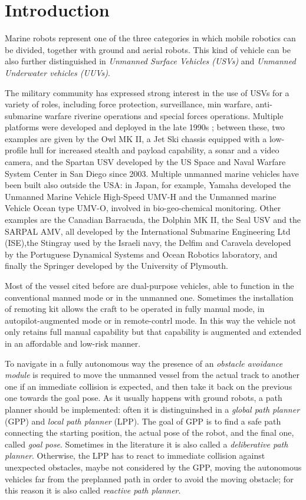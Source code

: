 \documentclass[journal]{IEEEtran}
\begin{document}
\section{Introduction} \label{introduction}

      Marine robots represent one of the three categories in which mobile robotics can be divided, together with ground and aerial robots. This kind of vehicle can be also further distinguished in \textit{Unmanned Surface Vehicles (USVs)} and \textit{Unmanned Underwater vehicles (UUVs)}.

      \indent The military community has expressed strong interest in the use of USVs for a variety of roles, including force protection, surveillance, min warfare, anti-submarine warfare riverine operations and special forces operations. Multiple platforms were developed and deployed in the late 1990s  \parencite{Bertram2008}; between these, two examples are given by the Owl MK II, a Jet Ski chassis equipped with a low-profile hull for increased stealth and payload capability, a sonar and a video camera, and the Spartan USV developed by the US Space and Naval Warfare System Center in San Diego since 2003. Multiple unmanned marine vehicles have been built also outside the USA: in Japan, for example, Yamaha developed the Unmanned Marine Vehicle High-Speed UMV-H and the Unmanned marine Vehicle Ocean type UMV-O, involved in bio-geo-chemical monitoring. Other examples are the Canadian Barracuda, the Dolphin MK II, the Seal USV and the SARPAL AMV, all developed by the International Submarine Engineering Ltd (ISE),the Stingray used by the Israeli navy, the Delfim and Caravela developed by the Portuguese Dynamical Systems and Ocean Robotics laboratory, and finally the Springer developed by the University of Plymouth.

      \indent Most of the vessel cited before are dual-purpose vehicles, able to function in the conventional manned mode or in the unmanned one. Sometimes the installation of remoting kit allows the craft to be operated in fully manual mode, in autopilot-augmented mode or in remote-contrl mode. In this way the vehicle not only retains full manual capability but that capability is augmented and extended in an affordable and low-risk manner.

      \indent To navigate in a fully autonomous way the presence of an \textit{obstacle avoidance module} is required to move the unmanned vessel from the actual track to another one if an immediate collision is expected, and then take it back on the previous one towards the goal pose. As it usually happens with ground robots, a path planner should be implemented: often it is distinguinshed in a \textit{global path planner} (GPP) and \textit{local path planner} (LPP). The goal of GPP is to find a safe path connecting the starting position, the actual pose of the robot, and the final one, called \textit{goal pose}. Sometimes in the literature it is also called a \textit{deliberative path planner}. Otherwise, the LPP has to react to immediate collision against unexpected obstacles, maybe not considered by the GPP, moving the autonomous vehicles far from the preplanned path in order to avoid the moving obstacle; for this reason it is also called \textit{reactive path planner}.
\end{document}
